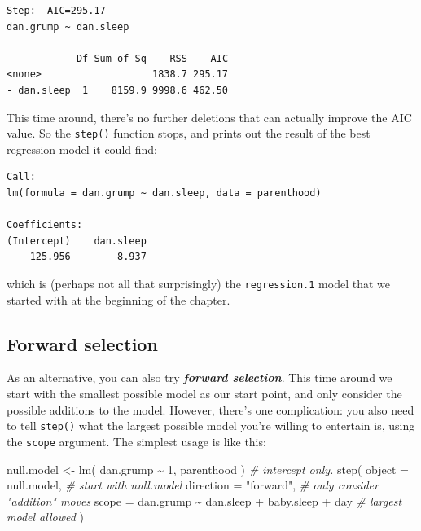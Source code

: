 \documentclass[
]{book}
\newenvironment{Shaded}{\begin{snugshade}}{\end{snugshade}}
\newcommand{\AttributeTok}[1]{\textcolor[rgb]{0.77,0.63,0.00}{#1}}
\newcommand{\CommentTok}[1]{\textcolor[rgb]{0.56,0.35,0.01}{\textit{#1}}}
\newcommand{\DecValTok}[1]{\textcolor[rgb]{0.00,0.00,0.81}{#1}}
\newcommand{\FunctionTok}[1]{\textcolor[rgb]{0.00,0.00,0.00}{#1}}
\newcommand{\NormalTok}[1]{#1}
\newcommand{\OtherTok}[1]{\textcolor[rgb]{0.56,0.35,0.01}{#1}}
\newcommand{\SpecialCharTok}[1]{\textcolor[rgb]{0.00,0.00,0.00}{#1}}
\newcommand{\StringTok}[1]{\textcolor[rgb]{0.31,0.60,0.02}{#1}}
\begin{document}
\begin{verbatim}
Step:  AIC=295.17
dan.grump ~ dan.sleep

            Df Sum of Sq    RSS    AIC
<none>                   1838.7 295.17
- dan.sleep  1    8159.9 9998.6 462.50
\end{verbatim}

This time around, there's no further deletions that can actually improve the AIC value. So the \texttt{step()} function stops, and prints out the result of the best regression model it could find:

\begin{verbatim}
Call:
lm(formula = dan.grump ~ dan.sleep, data = parenthood)

Coefficients:
(Intercept)    dan.sleep  
    125.956       -8.937  
\end{verbatim}

which is (perhaps not all that surprisingly) the \texttt{regression.1} model that we started with at the beginning of the chapter.

\hypertarget{forward-selection}{%
\subsection{Forward selection}\label{forward-selection}}

As an alternative, you can also try \textbf{\emph{forward selection}}. This time around we start with the smallest possible model as our start point, and only consider the possible additions to the model. However, there's one complication: you also need to tell \texttt{step()} what the largest possible model you're willing to entertain is, using the \texttt{scope} argument. The simplest usage is like this:

\begin{Shaded}
\begin{Highlighting}[]
\NormalTok{ null.model }\OtherTok{\textless{}{-}} \FunctionTok{lm}\NormalTok{( dan.grump }\SpecialCharTok{\textasciitilde{}} \DecValTok{1}\NormalTok{, parenthood )   }\CommentTok{\# intercept only.}
 \FunctionTok{step}\NormalTok{( }\AttributeTok{object =}\NormalTok{ null.model,     }\CommentTok{\# start with null.model}
       \AttributeTok{direction =} \StringTok{"forward"}\NormalTok{,   }\CommentTok{\# only consider "addition" moves}
       \AttributeTok{scope =}\NormalTok{  dan.grump }\SpecialCharTok{\textasciitilde{}}\NormalTok{ dan.sleep }\SpecialCharTok{+}\NormalTok{ baby.sleep }\SpecialCharTok{+}\NormalTok{ day  }\CommentTok{\# largest model allowed}
\NormalTok{ )}
\end{Highlighting}
\end{Shaded}
\end{document}
